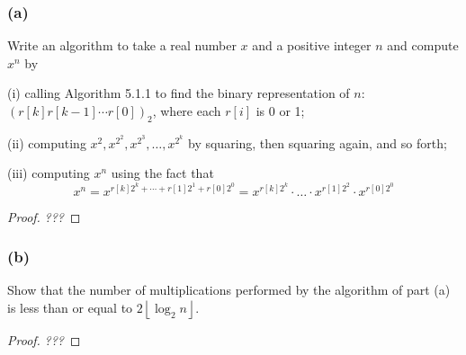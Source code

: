 \documentclass[14pt]{extarticle}
\newcommand{\floor}[1]{{\left\lfloor#1\right\rfloor}}
\begin{document}
\subsubsection{(a)}
Write an algorithm to take a real number \(x\) and a positive integer \(n\) and compute \(x^n\) by

(i) calling Algorithm 5.1.1 to find the binary representation of \(n\): \((r[k] r[k - 1] \cdots r[0])_2\), where each 
\(r[i]\) is 0 or 1; 

(ii) computing \(x^2, x^{2^2}, x^{2^3}, \ldots, x^{2^k}\) by squaring, then squaring again, and so forth;

(iii) computing \(x^n\) using the fact that 
\[
x^n = x^{r[k]2^k + \cdots + r[1]2^1 + r[0]2^0} = x^{r[k]2^k} \cdot \ldots \cdot x^{r[1]2^2} \cdot x^{r[0]2^0}
\]
\begin{proof}
{\it ???}
\end{proof}

\subsubsection{(b)}
Show that the number of multiplications performed by the algorithm of part (a) is less than or equal to 
\(2\floor{\log_2 n}\).

\begin{proof}
{\it ???}
\end{proof}
\end{document}
